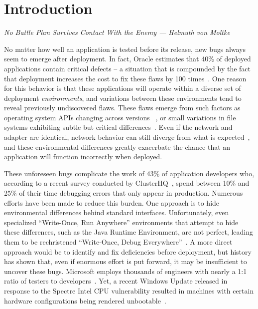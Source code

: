 \section{Introduction}
\label{SEC:introduction}
\textit{No Battle Plan Survives Contact With the Enemy --- Helmuth von Moltke}

No matter how well an application is tested before its release,
new bugs always seem to emerge after deployment.
In fact, Oracle estimates that 40\% of deployed applications
contain critical defects -- a situation that is compounded
by the fact that deployment
increases the cost to fix these flaws by 100 times~\cite{OracleAppQuality}.
One reason for this behavior
is that these applications will operate within a diverse set of
deployment \emph{environments},
and variations between these environments tend to
reveal previously undiscovered flaws.
These flaws emerge from
such factors as
operating system APIs changing across versions
~\cite{LinuxGlibcChanges, WinAPICompat, MuslDifferences},
or small variations in file systems exhibiting subtle but critical
differences~\cite{EXT4Layout, AppleHFS, WindowsNTFS}.
Even if the network and adapter are identical,
network behavior can still diverge from what is expected~\cite{vbox,
NMAPOSDifferences, VMWareNATFailure},
and these environmental differences greatly exacerbate
the chance that an application will function incorrectly when deployed.

These unforeseen bugs
complicate the work of 43\% of application developers who, according to a
recent survey conducted by ClusterHQ~\cite{ClusterHQSurvey},
spend between 10\% and 25\% of their time
debugging errors that only appear in production.
Numerous efforts have been made to reduce this burden.
One approach
is to hide environmental differences behind standard interfaces.
Unfortunately,
even specialized ``Write-Once, Run Anywhere'' environments
that attempt to hide these differences,
such as the Java Runtime Environment,
are not perfect,
leading them to be rechristened ``Write-Once, Debug Everywhere''~\cite{WODE}.
A more direct approach would be
to identify and fix deficiencies before deployment,
but history has shown that,
even if enormous effort is put forward,
it may be insufficient to uncover these bugs.
Microsoft employs thousands of engineers with nearly a
1:1 ratio of testers to developers~\cite{Page2009}.
Yet, a recent Windows Update released
in response to the Spectre Intel CPU vulnerability
resulted in machines with certain hardware configurations
being rendered unbootable~\cite{kb4056892}.

